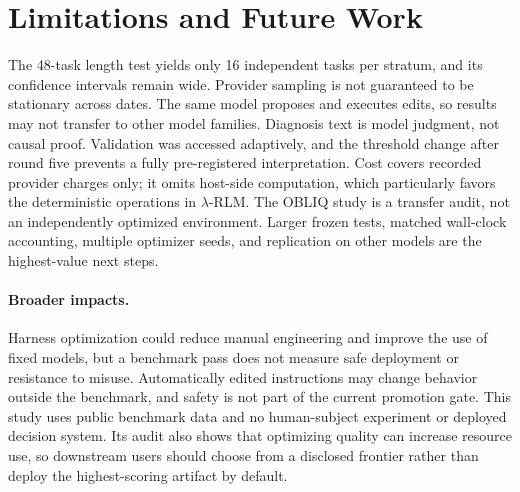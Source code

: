\documentclass[letterpaper]{article} %
\begin{document}



\section{Limitations and Future Work}
\label{sec:limitations}

The 48-task length test yields only 16 independent tasks per stratum, and its
confidence intervals remain wide. Provider sampling is not guaranteed to be
stationary across dates. The same model proposes and executes edits, so results
may not transfer to other model families. Diagnosis text is model judgment, not
causal proof. Validation was accessed adaptively, and the threshold change after
round five prevents a fully pre-registered interpretation. Cost covers recorded
provider charges only; it omits host-side computation, which particularly favors
the deterministic operations in $\lambda$-RLM. The OBLIQ study is a transfer
audit, not an independently optimized environment. Larger frozen tests, matched
wall-clock accounting, multiple optimizer seeds, and replication on other
models are the highest-value next steps.

\paragraph{Broader impacts.}
Harness optimization could reduce manual engineering and improve the use of
fixed models, but a benchmark pass does not measure safe deployment or resistance
to misuse. Automatically edited instructions may change behavior outside the
benchmark, and safety is not part of the current promotion gate. This study uses
public benchmark data and no human-subject experiment or deployed decision
system. Its audit also shows that optimizing quality can increase resource use,
so downstream users should choose from a disclosed frontier rather than deploy
the highest-scoring artifact by default.



\clearpage
\appendix




% 
\end{document}
